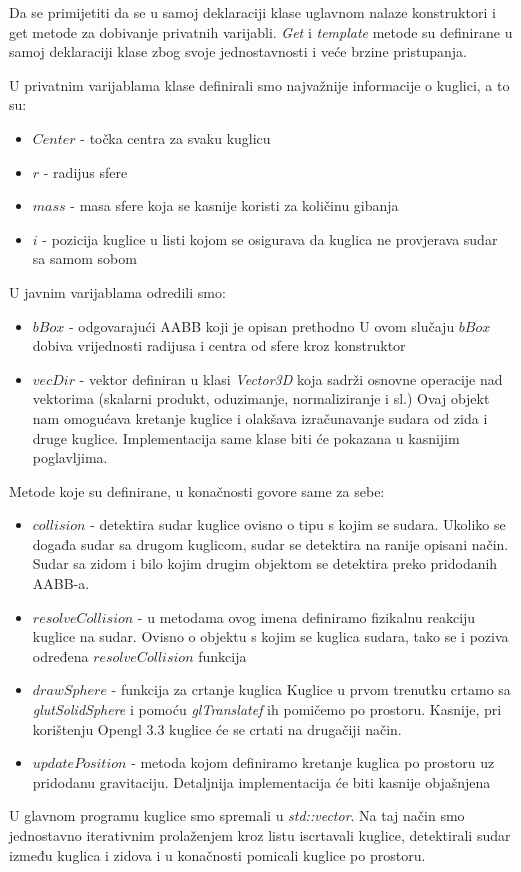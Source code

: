Da se primijetiti da se u samoj deklaraciji klase uglavnom nalaze konstruktori i get metode za dobivanje privatnih varijabli. \emph{Get} i \emph{template} metode su definirane u samoj deklaraciji klase zbog svoje jednostavnosti i veće brzine pristupanja.

U privatnim varijablama klase definirali smo najvažnije informacije o kuglici, a to su:

\begin{itemize}
	\item $Center$ - točka centra za svaku kuglicu
	\item $r$ - radijus sfere
	\item $mass$ - masa sfere koja se kasnije koristi za količinu gibanja
	\item $i$ - pozicija kuglice u listi kojom se osigurava da kuglica ne provjerava sudar sa samom sobom 

\end{itemize}

U javnim varijablama odredili smo:
\begin{itemize}
	\item $bBox$ - odgovarajući AABB koji je opisan prethodno
	\newline
	U ovom slučaju $bBox$ dobiva vrijednosti radijusa i centra od sfere kroz konstruktor
	\item $vecDir$ - vektor definiran u klasi \emph{Vector3D} koja sadrži osnovne operacije nad vektorima (skalarni produkt, oduzimanje, normaliziranje i sl.)
	\newline
	Ovaj objekt nam omogućava kretanje kuglice i olakšava izračunavanje sudara od zida i druge kuglice. Implementacija same klase biti će pokazana u kasnijim poglavljima.
	
\end{itemize}

Metode koje su definirane, u konačnosti govore same za sebe:
\begin{itemize}
	\item $collision$ - detektira sudar kuglice ovisno o tipu s kojim se sudara.\newline
	Ukoliko se događa sudar sa drugom kuglicom, sudar se detektira na ranije opisani način. Sudar sa zidom i bilo kojim drugim objektom se detektira preko pridodanih AABB-a.
	\item $resolveCollision$ - u metodama ovog imena definiramo fizikalnu reakciju kuglice na sudar. Ovisno o objektu s kojim se kuglica sudara, tako se i poziva određena $resolveCollision$ funkcija
	\item $drawSphere$ - funkcija za crtanje kuglica
	\newline
	Kuglice u prvom trenutku crtamo sa \emph{glutSolidSphere} i pomoću \emph{glTranslatef} ih pomičemo po prostoru. Kasnije, pri korištenju Opengl 3.3 kuglice će se crtati na drugačiji način.
	\item $updatePosition$ - metoda kojom definiramo kretanje kuglica po prostoru uz pridodanu gravitaciju. \newline
	Detaljnija implementacija će biti kasnije objašnjena
\end{itemize}

U glavnom programu kuglice smo spremali u  \emph{std::vector}. Na taj način smo jednostavno iterativnim prolaženjem kroz listu iscrtavali kuglice, detektirali sudar između kuglica i zidova i u konačnosti pomicali kuglice po prostoru.
 